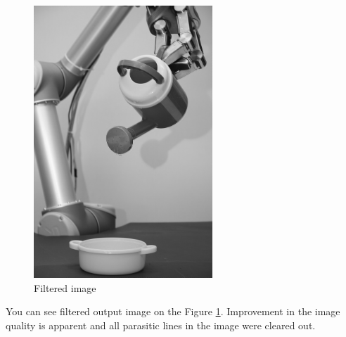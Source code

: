 \documentclass[11pt]{article}
\numberwithin{equation}{section}
\begin{document}
\begin{figure}[t]
	\centering
	\vspace{-2.5cm}
	\includegraphics[width=0.6\textwidth]{fig/OutputImage4_1.png}
	\caption{Filtered image}
	\label{fig:outputimage41}
\end{figure}

\newpage
You can see filtered output image on the Figure \ref{fig:outputimage41}. Improvement in the image quality is apparent and all parasitic lines in the image were cleared out.


\newpage
\end{document}

